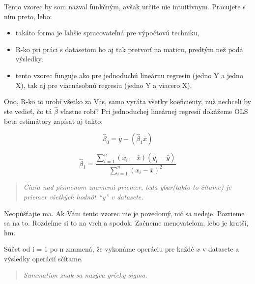 \begin{Shaded}
\end{Shaded}

Tento vzorec by som nazval funkčným, avšak určite nie intuitívnym.
Pracujete s ním preto, lebo:

\begin{itemize}
\tightlist
\item
  takáto forma je ľahšie spracovateľná pre výpočtovú techniku,
\item
  R-ko pri práci s datasetom ho aj tak pretvorí na maticu, predtým než
  podá výsledky,
\item
  tento vzorec funguje ako pre jednoduchú lineárnu regresiu (jedno Y a
  jedno X), tak aj pre viacnásobnú regresiu (jedno Y a viacero X).
\end{itemize}

Ono, R-ko to urobí všetko za Vás, samo vyráta všetky koeficienty, nuž
nechceli by ste vedieť, čo tá \(\hat\beta\) vlastne robí? Pri
jednoduchej lineárnej regresií dokážeme OLS beta estimátory zapísať aj
takto:

\[\hat\beta_0 = \overline{y} - (\hat\beta_1\overline{x})\]

\[\hat\beta_1 = \frac{\sum_{i=1}^{n} (x_i - \overline{x})(y_i - \overline{y})}{\sum_{i=1}^{n} (x_i - \overline{x})^2}\]

\begin{quote}
\emph{Čiara nad písmenom znamená priemer, teda ybar(takto to čítame) je
priemer všetkých hodnôt ``y'' v datasete.}
\end{quote}

Neopúšťajte ma. Ak Vám tento vzorec nie je povedomý, nič sa nedeje.
Pozrieme sa na to. Rozdeľme si to na vrch a spodok. Začneme menovateľom,
lebo je kratší, hm.

Súčet od i = 1 po n znamená, že vykonáme operáciu pre každé \(x\) v
datasete a výsledky operácií sčítame.

\begin{quote}
\emph{Summation znak sa nazýva grécky sigma.}
\end{quote}

